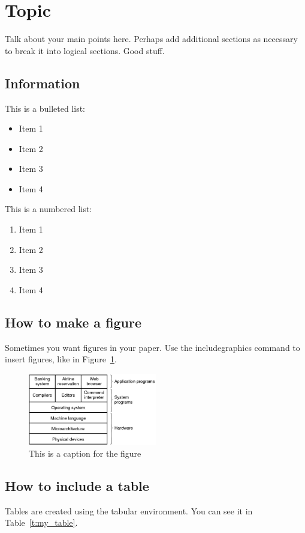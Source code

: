 \section{Topic}
\label{s:topic} %

Talk about your main points here.
Perhaps add additional sections as necessary to break it into logical sections.
Good stuff.

\subsection{Information}

This is a bulleted list:
\begin{itemize}
\item Item 1
\item Item 2
\item Item 3
\item Item 4
\end{itemize}

This is a numbered list:
\begin{enumerate}
\item Item 1
\item Item 2
\item Item 3
\item Item 4
\end{enumerate}

\subsection{How to make a figure}
Sometimes you want figures in your paper.
Use the includegraphics command to insert figures, like in Figure~\ref{f:os_block}.

\begin{figure}
\centering %
\includegraphics[width=0.5\textwidth]{figures/os_block.png}
\caption{This is a caption for the figure}
\label{f:os_block}
\end{figure}

\subsection{How to include a table}
Tables are created using the tabular environment.
You can see it in Table~\ref{t:my_table}.

